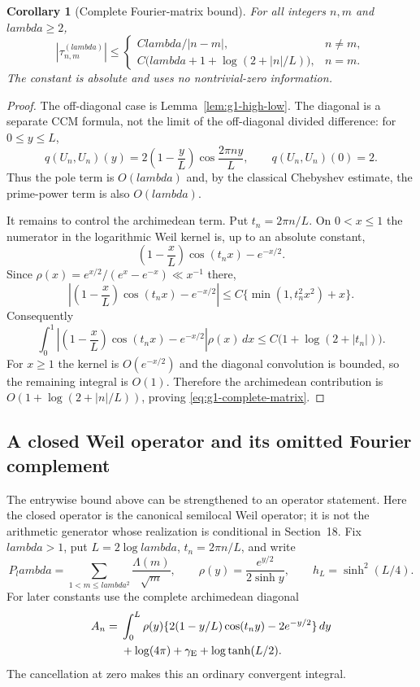 \documentclass[11pt]{article}
\def\lambda{lambda}%
\newtheorem{corollary}[theorem]{Corollary}
\theoremstyle{remark}
\begin{document}
\begin{corollary}[Complete Fourier-matrix bound]\label{cor:g1-complete-matrix}
For all integers $n,m$ and $\lambda\ge2$,
\begin{equation}\label{eq:g1-complete-matrix}
 \boxed{
 |\tau^{(\lambda)}_{n,m}|
 \le
 \begin{cases}
 C\lambda/|n-m|,&n\ne m,\\[2mm]
 C\bigl(\lambda+1+\log(2+|n|/L)\bigr),&n=m.
 \end{cases}}
\end{equation}
The constant is absolute and uses no nontrivial-zero information.
\end{corollary}
\begin{proof}
The off-diagonal case is Lemma~\ref{lem:g1-high-low}.  The diagonal is a
separate CCM formula, not the limit of the off-diagonal divided difference:
for $0\le y\le L$,
\[
 q(U_n,U_n)(y)=2\left(1-\frac yL\right)
 \cos\frac{2\pi ny}{L},
 \qquad q(U_n,U_n)(0)=2.
\]
Thus the pole term is $O(\lambda)$ and, by the classical Chebyshev estimate,
the prime-power term is also $O(\lambda)$.

It remains to control the archimedean term.  Put $t_n=2\pi n/L$.  On
$0<x\le1$ the numerator in the logarithmic Weil kernel is, up to an absolute
constant,
\[
 \left(1-\frac xL\right)\cos(t_nx)-e^{-x/2}.
\]
Since $\rho(x)=e^{x/2}/(e^x-e^{-x})\ll x^{-1}$ there,
\[
 \left|\left(1-\frac xL\right)\cos(t_nx)-e^{-x/2}\right|
 \le C\{\min(1,t_n^2x^2)+x\}.
\]
Consequently
\[
 \int_0^1
 \left|\left(1-\frac xL\right)\cos(t_nx)-e^{-x/2}\right|
 \rho(x)\,dx
 \le C\bigl(1+\log(2+|t_n|)\bigr).
\]
For $x\ge1$ the kernel is $O(e^{-x/2})$ and the diagonal convolution is
bounded, so the remaining integral is $O(1)$.  Therefore the archimedean
contribution is
$O(1+\log(2+|n|/L))$, proving \eqref{eq:g1-complete-matrix}.
\end{proof}

\subsection{A closed Weil operator and its omitted Fourier complement}
The entrywise bound above can be strengthened to an operator statement.
Here the closed operator is the canonical semilocal Weil operator; it is
not the arithmetic generator whose realization is conditional in Section~18.
Fix $\lambda>1$, put $L=2\log\lambda$, $t_n=2\pi n/L$, and write
\[
 P_\lambda=\sum_{1<m\le\lambda^2}\frac{\Lambda(m)}{\sqrt m},
 \qquad \rho(y)=\frac{e^{y/2}}{2\sinh y},
 \qquad h_L=\sinh^2(L/4).
\]
For later constants use the complete archimedean diagonal
\begin{align}
 A_n={}&\int_0^L\rho(y)
 \{2(1-y/L)\cos(t_ny)-2e^{-y/2}\}\,dy \notag\\
 &+\log(4\pi)+\gamma_{\rm E}+\log\tanh(L/2).
 \label{eq:v114-arch-diagonal}
\end{align}
The cancellation at zero makes this an ordinary convergent integral.
\end{document}
